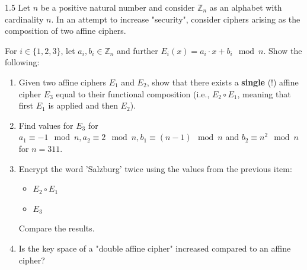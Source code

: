 \documentclass[]{scrartcl}
\newcommand{\ZZ}{\mathbb{Z}}
\newcounter{exercise}
\newcounter{qid}[section]
\newcommand{\exerciseprefix}{prefix}
\newcommand{\questiontitle}{Questions}
\newcommand{\blockid}{B2}
\newcommand{\exname}{}
\begin{document}
\renewcommand{\exerciseprefix}{PS-\blockid{}-E\theexercise: \exname-Q\theqid}
\renewcommand{\questiontitle}{\exerciseprefix{}: Cryptographic properties}
\begin{exercisebox}{1.5}
Let $n$ be a positive natural number and consider $\ZZ_{n}$ as an alphabet with cardinality $n$. In an attempt to increase "security", consider ciphers arising as the composition of two affine ciphers. 

For $i \in \lbrace 1, 2, 3\rbrace$, let $a_{i}, b_{i} \in \ZZ_{n}$ and further $E_{i}(x) = a_{i} \cdot x + b_{i} \mod n$. Show the following:
\begin{enumerate}
    \item Given two affine ciphers $E_{1}$ and $E_{2}$, show that there exists a \textbf{single} (!) affine cipher $E_{3}$ equal to their functional composition (i.e., $E_{2} \circ E_{1}$, meaning that first $E_{1}$ is applied and then $E_{2}$). 
    \item Find values for $E_{3}$ for $a_{1} \equiv -1 \mod n, a_{2} \equiv 2 \mod n, b_{1} \equiv (n-1) \mod n$ and $b_{2} \equiv n^{2} \mod n$ for $n = 311$.
    \item Encrypt the word 'Salzburg' twice using the values from the previous item:
    \begin{itemize}
        \item $E_{2} \circ E_{1}$
        \item $E_{3}$
    \end{itemize}
    Compare the results. 
    \item Is the key space of a "double affine cipher" increased compared to an affine cipher?
\end{enumerate}
\end{exercisebox}
\end{document}
